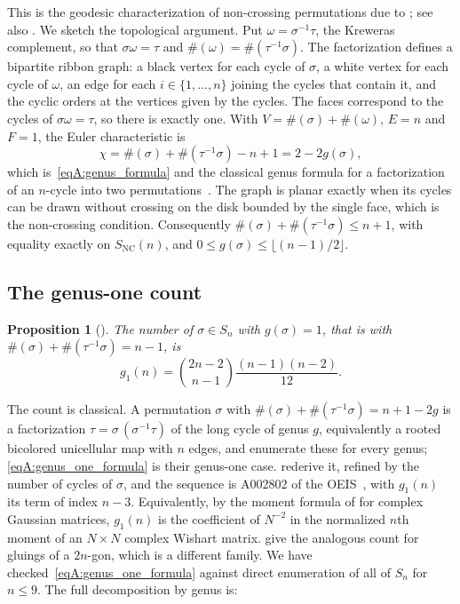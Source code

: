 \documentclass[11pt,letterpaper]{article}
\theoremstyle{plain}
\newtheorem{proposition}[theorem]{Proposition}
\theoremstyle{definition}
\theoremstyle{remark}
\begin{document}
This is the geodesic characterization of non-crossing permutations due to \citet{biane1997}; see also \citet[Lecture~23]{nicaspeicher2006}. We sketch the topological argument. Put $\omega = \sigma^{-1}\tau$, the Kreweras complement, so that $\sigma\omega = \tau$ and $\#(\omega) = \#(\tau^{-1}\sigma)$. The factorization defines a bipartite ribbon graph: a black vertex for each cycle of $\sigma$, a white vertex for each cycle of $\omega$, an edge for each $i \in \{1, \ldots, n\}$ joining the cycles that contain it, and the cyclic orders at the vertices given by the cycles. The faces correspond to the cycles of $\sigma\omega = \tau$, so there is exactly one. With $V = \#(\sigma) + \#(\omega)$, $E = n$ and $F = 1$, the Euler characteristic is
\begin{equation}
\label{eqA:euler_char}
\chi = \#(\sigma) + \#(\tau^{-1}\sigma) - n + 1 = 2 - 2g(\sigma),
\end{equation}
which is~\eqref{eqA:genus_formula} and the classical genus formula for a factorization of an $n$-cycle into two permutations~\citep{jacques1968}. The graph is planar exactly when its cycles can be drawn without crossing on the disk bounded by the single face, which is the non-crossing condition. Consequently $\#(\sigma) + \#(\tau^{-1}\sigma) \le n + 1$, with equality exactly on $S_{\mathrm{NC}}(n)$, and $0 \le g(\sigma) \le \lfloor (n-1)/2 \rfloor$.

\subsection{The genus-one count}
\label{subsecA:genus_one}

\begin{proposition}[\citealp{goupilschaeffer1998}]
\label{thmA:genus_one_count}
The number of $\sigma \in S_n$ with $g(\sigma) = 1$, that is with $\#(\sigma) + \#(\tau^{-1}\sigma) = n - 1$, is
\begin{equation}
\label{eqA:genus_one_formula}
g_1(n) = \binom{2n-2}{n-1} \frac{(n-1)(n-2)}{12}.
\end{equation}
\end{proposition}

The count is classical. A permutation $\sigma$ with $\#(\sigma) + \#(\tau^{-1}\sigma) = n + 1 - 2g$ is a factorization $\tau = \sigma\,(\sigma^{-1}\tau)$ of the long cycle of genus $g$, equivalently a rooted bicolored unicellular map with $n$ edges, and \citet{goupilschaeffer1998} enumerate these for every genus; \eqref{eqA:genus_one_formula} is their genus-one case. \citet{corihetyei2014} rederive it, refined by the number of cycles of $\sigma$, and the sequence is A002802 of the OEIS~\citep{oeisA002802}, with $g_1(n)$ its term of index $n - 3$. Equivalently, by the moment formula of \citet{hanlonstanleystembridge1992} for complex Gaussian matrices, $g_1(n)$ is the coefficient of $N^{-2}$ in the normalized $n$th moment of an $N \times N$ complex Wishart matrix. \citet{harer1986euler} give the analogous count for gluings of a $2n$-gon, which is a different family. We have checked~\eqref{eqA:genus_one_formula} against direct enumeration of all of $S_n$ for $n \le 9$. The full decomposition by genus is:
\end{document}
